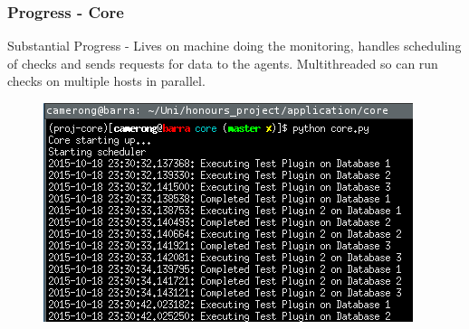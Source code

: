 \documentclass{beamer}
\begin{document}
	\begin{frame}
		\frametitle{Progress - Core}
		Substantial Progress - Lives on machine doing the monitoring, handles scheduling of checks and
		sends requests for data to the agents.  Multithreaded so can run checks on multiple hosts in
		parallel.
		\begin{figure}
			\includegraphics[scale=0.75]{assets/core1.png}
		\end{figure}
	\end{frame}
	
\end{document}
